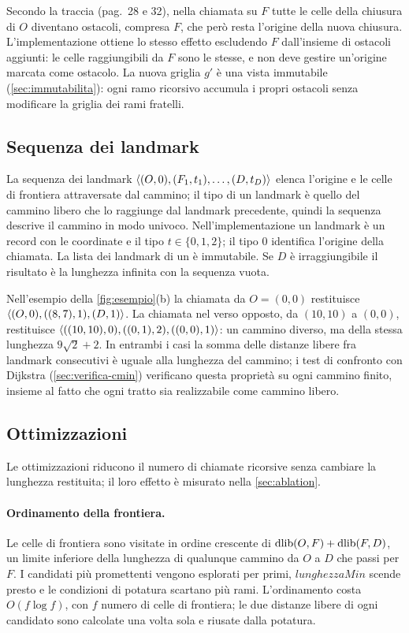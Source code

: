 Secondo la traccia (pag.~28 e 32), nella chiamata su $F$ tutte le celle della
chiusura di $O$ diventano ostacoli, compresa $F$, che però resta l'origine
della nuova chiusura. L'implementazione ottiene lo stesso effetto escludendo
$F$ dall'insieme di ostacoli aggiunti: le celle raggiungibili da $F$ sono le
stesse, e  non deve gestire un'origine marcata come
ostacolo. La nuova griglia $g'$ è una vista immutabile
(\cref{sec:immutabilita}): ogni ramo ricorsivo accumula i propri ostacoli
senza modificare la griglia dei rami fratelli.

\subsection{Sequenza dei landmark}

La sequenza dei landmark $\langle (O,0), (F_1,t_1), \dots, (D,t_D) \rangle$ elenca
l'origine e le celle di frontiera attraversate dal cammino; il tipo di un
landmark è quello del cammino libero che lo raggiunge dal landmark
precedente, quindi la sequenza descrive il cammino in modo univoco.
Nell'implementazione un landmark è un record con le coordinate e il tipo
$t \in \{0, 1, 2\}$; il tipo $0$ identifica l'origine della chiamata. La
lista dei landmark di un  è immutabile. Se $D$ è
irraggiungibile il risultato è la lunghezza infinita con la sequenza vuota.

Nell'esempio della \cref{fig:esempio}(b) la chiamata da $O=(0,0)$ restituisce
$\langle (O,0), ((8,7),1), (D,1) \rangle$. La chiamata nel verso opposto, da
$(10,10)$ a $(0,0)$, restituisce
$\langle ((10,10),0), ((0,1),2), ((0,0),1) \rangle$: un cammino diverso, ma della stessa
lunghezza $9\sqrt{2}+2$. In entrambi i casi la somma delle distanze libere
fra landmark consecutivi è uguale alla lunghezza del cammino; i test di
confronto con Dijkstra (\cref{sec:verifica-cmin}) verificano questa proprietà
su ogni cammino finito, insieme al fatto che ogni tratto sia realizzabile come
cammino libero.

\subsection{Ottimizzazioni}
\label{sec:ottimizzazioni}

Le ottimizzazioni riducono il numero di chiamate ricorsive senza cambiare la
lunghezza restituita; il loro effetto è misurato nella \cref{sec:ablation}.

\paragraph{Ordinamento della frontiera.} Le celle di frontiera sono visitate
in ordine crescente di $\operatorname{dlib}(O,F) + \operatorname{dlib}(F,D)$, un limite inferiore della
lunghezza di qualunque cammino da $O$ a $D$ che passi per $F$. I candidati
più promettenti vengono esplorati per primi, $\mathit{lunghezzaMin}$ scende
presto e le condizioni di potatura scartano più rami. L'ordinamento costa
$O(f \log f)$, con $f$ numero di celle di frontiera; le due distanze libere di
ogni candidato sono calcolate una volta sola e riusate dalla potatura.

